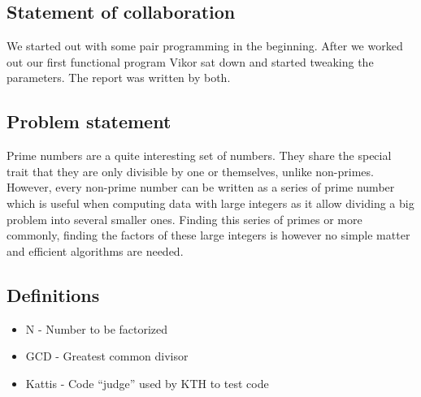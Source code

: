 \subsection{Statement of collaboration}
We started out with some pair programming in the beginning. After we worked out our first functional program Vikor sat down and started tweaking the parameters. The report was written by both.  

\subsection{Problem statement}
Prime numbers are a quite interesting set of numbers. They share the special trait that they are only divisible by one or themselves, unlike non-primes. However, every non-prime number can be written as a series of prime number which is useful when computing data with large integers as it allow dividing a big problem into several smaller ones.
Finding this series of primes or more commonly, finding the factors of these large integers is however no simple matter and efficient algorithms are needed.

\subsection{Definitions}
	
\begin{itemize}
  \item N - Number to be factorized
  \item GCD - Greatest common divisor
  \item Kattis - Code “judge” used by KTH to test code
\end{itemize}